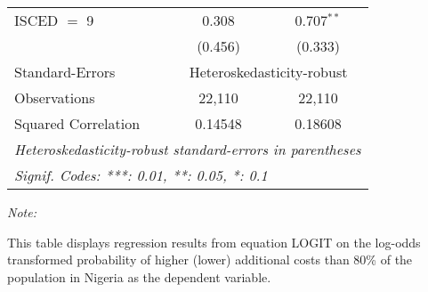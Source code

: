 \begin{table}[htbp!]
\begin{adjustbox}{width = 1\textwidth, max height = 0.95\textheight, center}
\begin{threeparttable}[b]
\begin{tabular}{lcc}
            ISCED $=$ 9          & 0.308          & 0.707$^{**}$\\   
                                 & (0.456)        & (0.333)\\   
            \midrule 
            Standard-Errors & \multicolumn{2}{c}{Heteroskedasticity-robust} \\ 
            Observations         & 22,110         & 22,110\\  
            Squared Correlation  & 0.14548        & 0.18608\\  
            \midrule \midrule
            \multicolumn{3}{l}{\emph{Heteroskedasticity-robust standard-errors in parentheses}}\\
            \multicolumn{3}{l}{\emph{Signif. Codes: ***: 0.01, **: 0.05, *: 0.1}}\\
         \end{tabular}
         
         \begin{tablenotes}\item \medskip \textit{Note:}
            \item This table displays regression results from equation LOGIT on the log-odds transformed probability of higher (lower) additional costs than 80\% of the population in Nigeria as the dependent variable. 
         \end{tablenotes}
      \end{threeparttable}
   \end{adjustbox}
\end{table}


